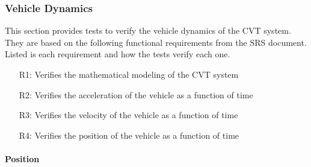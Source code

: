 \documentclass[12pt, titlepage]{article}
\begin{document}
\subsubsection{Vehicle Dynamics}

This section provides tests to verify the vehicle dynamics of the CVT system.
They are based on the following functional requirements from the SRS document.
Listed is each requirement and how the tests verify each one.
\begin{itemize}
  \item [R1:] Verifies the mathematical modeling of the CVT system
  \item [R2:] Verifies the acceleration of the vehicle as a function of time
  \item [R3:] Verifies the velocity of the vehicle as a function of time
  \item [R4:] Verifies the position of the vehicle as a function of time
\end{itemize}

\paragraph{Position}
\end{document}
